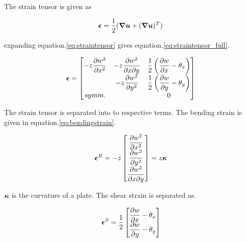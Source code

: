 \documentclass[main.tex]{subfiles}
\begin{document}
The strain tensor is given as 

\begin{equation}\label{eq:straintensor}
\boldsymbol{\epsilon}
=
\frac{1}{2} (\boldsymbol{\nabla u} + (\boldsymbol{\nabla u})^T)
\end{equation}
%

expanding equation.\ref{eq:straintensor} gives equation.\ref{eq:straintensor_full}.

\begin{align} \label{eq:straintensor_full}
\boldsymbol{\epsilon} =  
\begin{bmatrix}
 -z \dfrac{\partial w^2 }{\partial x^2} 
 & 
 -z \dfrac{\partial w^2 }{\partial x \partial y}
 & 
 \dfrac{1}{2} \left( \dfrac{\partial w}{\partial x}-\theta_x \right)
 \\
 &
 -z \dfrac{\partial w^2 }{\partial y^2} 
 &
  \dfrac{1}{2} \left( \dfrac{\partial w}{\partial y}-\theta_y \right)
  \\
  symm.
  &
  &
  0
\end{bmatrix}
\end{align}

The strain tensor is separated into to respective terms. The bending strain is given in equation.\ref{eq:bendingstrain}. 

\begin{align}\label{eq:bendingstrain}
\boldsymbol{\epsilon}^B = -z
\begin{bmatrix}
\dfrac{\partial w^2 }{\partial x^2}
\\
\dfrac{\partial w^2 }{\partial y^2}
\\
\dfrac{\partial w^2 }{\partial x \partial y}
\end{bmatrix}
=
 z \boldsymbol{\kappa}
\end{align}

$\boldsymbol{\kappa}$ is the curvature of a plate. The shear strain is separated as.

\begin{align}
\boldsymbol{\epsilon}^S = \dfrac{1}{2}
\begin{bmatrix}
\dfrac{\partial w}{\partial x}-\theta_x 
\\
\dfrac{\partial w}{\partial y}-\theta_y 
\end{bmatrix}
\end{align}
\end{document}

